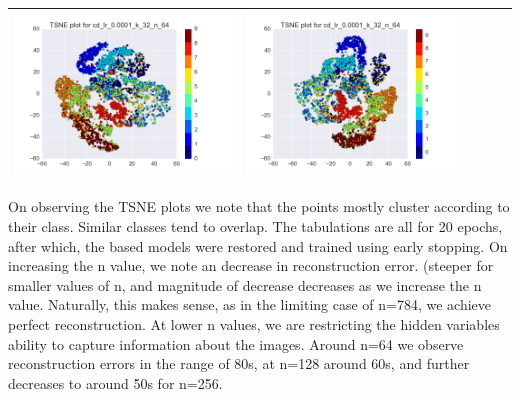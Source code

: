 \documentclass[12pt]{report}
\begin{document}
\begin{table}[H]
\begin{tabular}{ | c | c | c | c || c |}
\begin{minipage}{.3\textwidth}
      \includegraphics[scale=0.25]{cd_lr_0_0001_k_32_n_64.png}
    \end{minipage} &
    \begin{minipage}{.3\textwidth}
      \includegraphics[scale=0.25]{test_cd_lr_0_0001_k_32_n_64.png}
    \end{minipage}
   \\ \hline
  \end{tabular}
\end{table}

On observing the TSNE plots we note that the points mostly cluster according to their class. Similar classes tend to overlap. The tabulations are all for 20 epochs, after which, the based models were restored and trained using early stopping. On increasing the n value, we note an decrease in reconstruction error. (steeper for smaller values of n, and magnitude of decrease decreases as we increase the n value. Naturally, this makes sense, as in the limiting case of n=784, we achieve perfect reconstruction. At lower n values, we are restricting the hidden variables ability to capture information about the images. 
Around n=64 we observe reconstruction errors in the range of 80s, at n=128 around 60s, and further decreases to around 50s for n=256.
\end{document}
